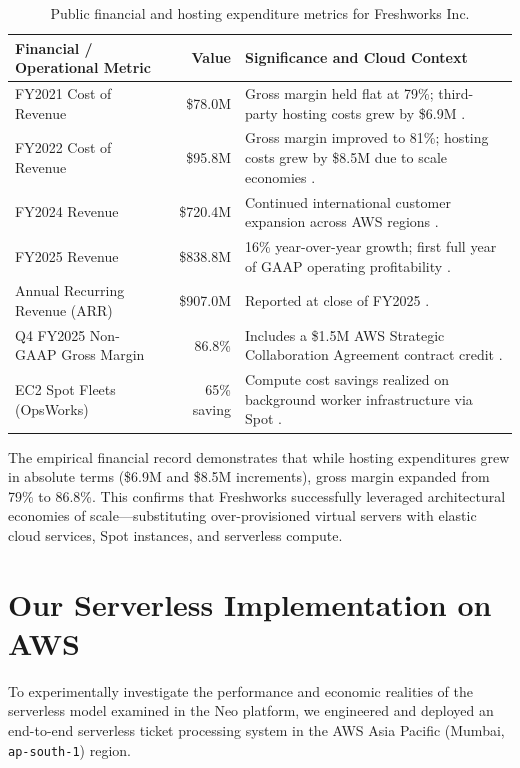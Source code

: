 \documentclass[10pt,a4paper]{article}
\begin{document}
\begin{table}[H]
\centering
\caption{Public financial and hosting expenditure metrics for Freshworks Inc.}
\label{tab:financials}
\small
\begin{tabularx}{\textwidth}{l r X}
\toprule
\textbf{Financial / Operational Metric} & \textbf{Value} & \textbf{Significance and Cloud Context} \\
\midrule
FY2021 Cost of Revenue & \$78.0M & Gross margin held flat at 79\%; third-party hosting costs grew by \$6.9M \cite{sec_10k_2021}. \\
FY2022 Cost of Revenue & \$95.8M & Gross margin improved to 81\%; hosting costs grew by \$8.5M due to scale economies \cite{sec_10k_2022}. \\
FY2024 Revenue & \$720.4M & Continued international customer expansion across AWS regions \cite{fw_q4_2025}. \\
FY2025 Revenue & \$838.8M & 16\% year-over-year growth; first full year of GAAP operating profitability \cite{fw_q4_2025}. \\
Annual Recurring Revenue (ARR) & \$907.0M & Reported at close of FY2025 \cite{fw_fool_2025}. \\
Q4 FY2025 Non-GAAP Gross Margin & 86.8\% & Includes a \$1.5M AWS Strategic Collaboration Agreement contract credit \cite{fw_fool_2025}. \\
EC2 Spot Fleets (OpsWorks) & 65\% saving & Compute cost savings realized on background worker infrastructure via Spot \cite{spot_freshworks}. \\
\bottomrule
\end{tabularx}
\end{table}

The empirical financial record demonstrates that while hosting expenditures grew in absolute terms (\$6.9M and \$8.5M increments), gross margin expanded from 79\% to 86.8\%. This confirms that Freshworks successfully leveraged architectural economies of scale---substituting over-provisioned virtual servers with elastic cloud services, Spot instances, and serverless compute.

\section{Our Serverless Implementation on AWS}
To experimentally investigate the performance and economic realities of the serverless model examined in the Neo platform, we engineered and deployed an end-to-end serverless ticket processing system in the AWS Asia Pacific (Mumbai, \texttt{ap-south-1}) region.
\end{document}
